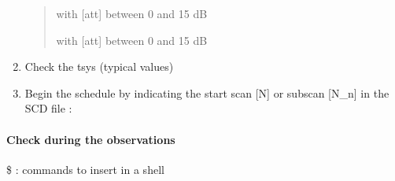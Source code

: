 \documentclass[letterpaper,10pt,english]{sphinxmanual}
\begin{document}
\begin{enumerate}
\begin{quote}

        with {[}att{]} between 0 and 15 dB

        with {[}att{]} between 0 and 15 dB

\end{quote}

\item {} 
Check the tsys (typical values)
\begin{quote}

\end{quote}

\item {} 
Begin the schedule by indicating the start scan {[}N{]} or subscan {[}N\_n{]} in the SCD file :
\begin{quote}

\end{quote}

\end{enumerate}


\paragraph{Check during the observations}
\label{Continuum/C-band/TP/check-obs:check-during-the-observations}\label{Continuum/C-band/TP/check-obs::doc}
\$ : commands to insert in a shell
\end{document}
